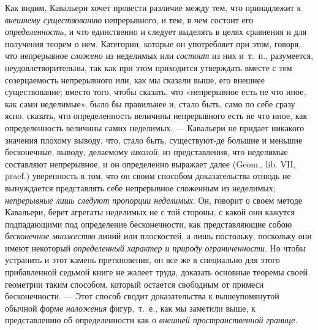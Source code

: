 Как видим, Кавальери хочет провести различие между тем, что принадлежит к
{\em внешнему существованию} непрерывного, и тем, в чем
состоит его {\em определенность}, и что единственно и
следует выделять в целях сравнения и для получения теорем о нем. Категории,
которые он употребляет при этом, говоря, что непрерывное
{\em сложено} из неделимых или
{\em состоит} из них и~т.~п., разумеется,
неудовлетворительны, так как при этом приходится утверждать вместе с тем
созерцаемость непрерывного или, как мы сказали выше, его внешнее
существование; вместо того, чтобы сказать, что «непрерывное есть не что
иное, как сами неделимые», было бы правильнее и, стало быть, само по себе
сразу ясно, сказать, что определенность величины непрерывного есть не что
иное, как определенность величины самих неделимых. — Кавальери не придает
никакого значения плохому выводу, что, стало быть, существуют-де большие и
меньшие бесконечные, выводу, делаемому {\em школой}, из
представления, что неделимые составляют непрерывное, и он определенно
выражает далее (Geom., lib. VII, praef.) уверенность в том, что он своим
способом доказательства отнюдь не вынуждается представлять себе непрерывное
сложенным из неделимых; {\em непрерывные лишь следуют
пропорции неделимых}. Он, говорит о своем методе Кавальери, берет агрегаты
неделимых не с той стороны, с какой они кажутся подпадающими под
определение бесконечности, как представляющие собою
{\em бесконечное множество} линий или плоскостей, а
лишь постольку, поскольку они имеют некоторый
{\em определенный характер и природу ограниченности}.
Но чтобы устранить и этот камень преткновения, он все же в специально для
этого прибавленной седьмой книге не жалеет труда, доказать основные теоремы
своей геометрии таким способом, который остается свободным от примеси
бесконечности. — Этот способ сводит доказательства к вышеупомянутой обычной
форме {\em наложения} фигур,~т.~е., как мы заметили
выше, к представлению об определенности как о
{\em внешней пространственной границе}.

